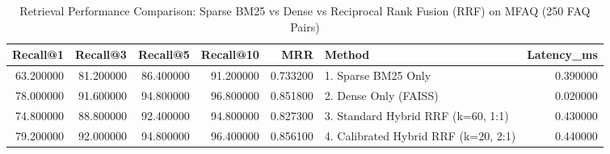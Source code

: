 \begin{table}
\caption{Retrieval Performance Comparison: Sparse BM25 vs Dense vs Reciprocal Rank Fusion (RRF) on MFAQ (250 FAQ Pairs)}
\label{tab:hybrid_retrieval}
\begin{tabular}{rrrrrlr}
\toprule
Recall@1 & Recall@3 & Recall@5 & Recall@10 & MRR & Method & Latency_ms \\
\midrule
63.200000 & 81.200000 & 86.400000 & 91.200000 & 0.733200 & 1. Sparse BM25 Only & 0.390000 \\
78.000000 & 91.600000 & 94.800000 & 96.800000 & 0.851800 & 2. Dense Only (FAISS) & 0.020000 \\
74.800000 & 88.800000 & 92.400000 & 94.800000 & 0.827300 & 3. Standard Hybrid RRF (k=60, 1:1) & 0.430000 \\
79.200000 & 92.000000 & 94.800000 & 96.400000 & 0.856100 & 4. Calibrated Hybrid RRF (k=20, 2:1) & 0.440000 \\
\bottomrule
\end{tabular}
\end{table}
